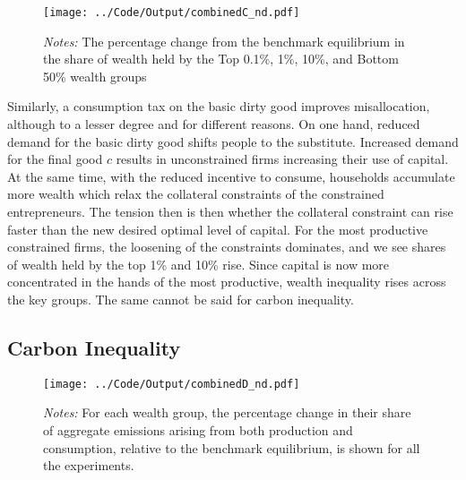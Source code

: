 \documentclass[12pt,a4paper]{article}
\begin{document}
\begin{figure}[h! btp]
    \centering
     \vspace{0.5em}
    \texttt{[image: ../Code/Output/combinedC\_nd.pdf]} 
               \captionsetup{font=footnotesize}
         \caption*{\textit{Notes:} The percentage change from the benchmark equilibrium in the share of wealth held by the Top 0.1\%, 1\%, 10\%, and Bottom 50\% wealth groups }
    \label{fig:wealth}

\end{figure}


\hspace*{6mm} Similarly, a consumption tax on the basic dirty good improves misallocation, although to a lesser degree and for different reasons. On one hand, reduced demand for the basic dirty good shifts people to the substitute. Increased demand for the final good $c$  results in unconstrained firms increasing their use of capital. At the same time, with the reduced incentive to consume, households accumulate more wealth which relax the collateral constraints of the constrained entrepreneurs. The tension then is then whether the collateral constraint can rise faster than the new desired optimal level of capital. For the most productive constrained firms, the loosening of the constraints dominates, and we see shares of wealth held by the top 1\% and 10\% rise. Since capital is now more concentrated in the hands of the most productive, wealth inequality rises across the key groups. The same cannot be said for carbon inequality.

    




\subsection{Carbon Inequality}

\begin{figure}[hbtp]
    \centering
    \vspace{0.5em}
    \texttt{[image: ../Code/Output/combinedD\_nd.pdf]} 
    \captionsetup{font=footnotesize}
 \caption*{\textit{Notes:} For each wealth group, the percentage change in their share of aggregate emissions arising from both production and consumption, relative to the benchmark equilibrium, is shown for all the experiments.}
      
        \label{fig:carboninequality}
\end{figure}
\end{document}
